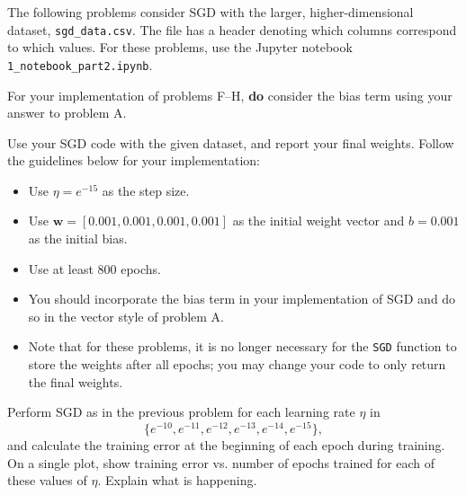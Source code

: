 \begin{solution}

\end{solution}


The following problems consider SGD with the larger, higher-dimensional dataset, \texttt{sgd_data.csv}.
The file has a header denoting which columns correspond to which values.
For these problems, use the Jupyter notebook \texttt{1_notebook_part2.ipynb}.

For your implementation of problems F--H, \textbf{do} consider the bias term using your answer to problem A.

\begin{problem}[6]
Use your SGD code with the given dataset, and report your final weights.
Follow the guidelines below for your implementation:

\begin{itemize}
	\item Use $\eta = e^{-15}$ as the step size.
	\item Use $\mathbf{w} = [0.001, 0.001, 0.001, 0.001]$ as the initial weight vector and $b = 0.001$ as the initial bias.
	\item Use at least 800 epochs.
	\item You should incorporate the bias term in your implementation of SGD and do so in the vector style of problem A.
	\item Note that for these problems, it is no longer necessary for the \texttt{SGD} function to store the weights after all epochs; you may change your code to only return the final weights.
\end{itemize}
\end{problem}
\begin{solution}
\end{solution}

\begin{problem}[2]
Perform SGD as in the previous problem for each learning rate $\eta$ in \[\{e^{-10}, e^{-11}, e^{-12}, e^{-13}, e^{-14}, e^{-15}\},\] and calculate the training error at the beginning of each epoch during training.
On a single plot, show training error vs. number of epochs trained for each of these values of $\eta$.
Explain what is happening.
\end{problem}
\begin{solution}

\end{solution}


